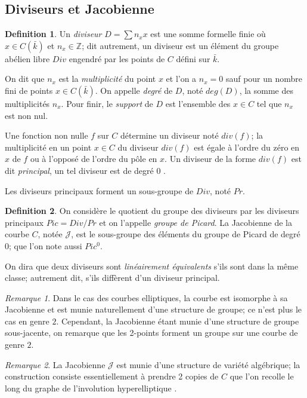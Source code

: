 \documentclass[a4paper,12pt]{article}
\theoremstyle{definition}
\newtheorem{definition}{Definition}[section]
\theoremstyle{remark}
\newtheorem{remarque}{Remarque}
\numberwithin{equation}{section}
\begin{document}
\subsection{Diviseurs et Jacobienne}

\begin{definition}
Un \emph{diviseur} $D = \sum n_x x$ est une somme formelle finie où $x \in C(\bar{k})$ et $n_x \in \mathbb{Z}$; dit autrement, un diviseur est un élément du groupe abélien libre $Div$ engendré par les points de $C$ défini sur $\bar{k}$.

On dit que $n_x$ est la \emph{multiplicité} du point $x$ et l'on a $n_x = 0$ sauf pour un nombre fini de points $x \in C(\bar{k})$. On appelle \emph{degré} de $D$, noté $deg(D)$, la somme des multiplicités $n_x$. Pour finir, le \emph{support} de $D$ est l'ensemble des $x \in C$ tel que $n_x$ est non nul.
\end{definition}

Une fonction non nulle $f$ sur $C$ détermine un diviseur noté $div(f)$; la multiplicité en un point $x \in C$ du diviseur $div(f)$ est égale à l'ordre du zéro en $x$ de $f$ ou à l'opposé de l'ordre du pôle en $x$. Un diviseur de la forme $div(f)$ est dit \emph{principal}, un tel diviseur est de degré 0 \citep{menezes}.

Les diviseurs principaux forment un sous-groupe de $Div$, noté $Pr$.
\begin{definition}
On considère le quotient du groupe des diviseurs par les diviseurs principaux $Pic = Div/Pr$ et on l'appelle \emph{groupe de Picard}.
La Jacobienne de la courbe $C$, notée $\mathcal{J}$, est le sous-groupe des éléments du groupe de Picard de degré 0; que l'on note aussi $Pic^0$.
\end{definition}

On dira que deux diviseurs sont \emph{linéairement équivalents} s'ils sont dans la même classe; autrement dit, s'ils diffèrent d'un diviseur principal.

\begin{remarque}
Dans le cas des courbes elliptiques, la courbe est isomorphe à sa Jacobienne et est munie naturellement d'une structure de groupe; ce n'est plus le cas en genre $2$. Cependant, la Jacobienne étant munie d'une structure de groupe sous-jacente, on remarque que les 2-points forment un groupe sur une courbe de genre $2$.
\end{remarque}

\begin{remarque}
La Jacobienne $\mathcal{J}$ est munie d'une structure de variété algébrique; la construction consiste essentiellement à prendre 2 copies de $C$ que l'on recolle le long du graphe de l'involution hyperelliptique \citep{cassels-Flynn}.
\end{remarque}
\end{document}
